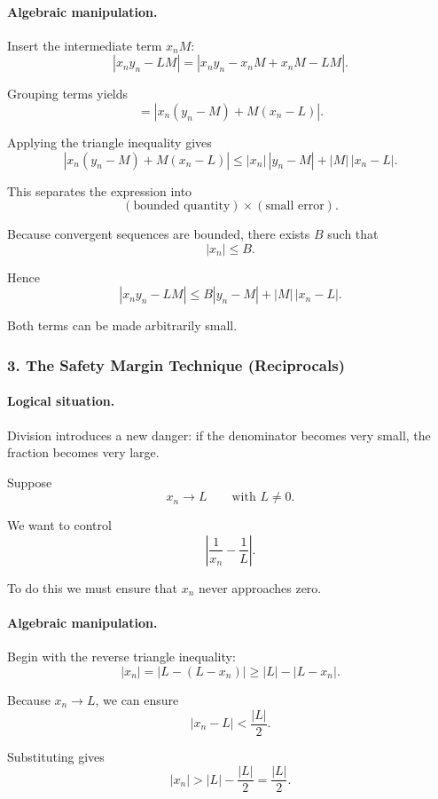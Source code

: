 \paragraph{Algebraic manipulation.}

Insert the intermediate term $x_n M$:
\[
|x_n y_n - LM|
=
|x_n y_n - x_n M + x_n M - LM|.
\]

Grouping terms yields
\[
=
|x_n(y_n - M) + M(x_n - L)|.
\]

Applying the triangle inequality gives
\[
|x_n(y_n - M) + M(x_n - L)|
\le
|x_n|\,|y_n - M|
+
|M|\,|x_n - L|.
\]

This separates the expression into
\[
(\text{bounded quantity}) \times (\text{small error}).
\]

Because convergent sequences are bounded, there exists $B$ such that
\[
|x_n| \le B.
\]

Hence
\[
|x_n y_n - LM|
\le
B|y_n - M| + |M|\,|x_n - L|.
\]

Both terms can be made arbitrarily small.

\bigskip

\subsubsection*{3. The Safety Margin Technique (Reciprocals)}

\paragraph{Logical situation.}

Division introduces a new danger: if the denominator becomes very
small, the fraction becomes very large.

Suppose
\[
x_n \to L
\qquad \text{with } L \neq 0.
\]

We want to control
\[
\left|\frac{1}{x_n} - \frac{1}{L}\right|.
\]

To do this we must ensure that $x_n$ never approaches zero.

\paragraph{Algebraic manipulation.}

Begin with the reverse triangle inequality:
\[
|x_n|
=
|L - (L - x_n)|
\ge
|L| - |L - x_n|.
\]

Because $x_n \to L$, we can ensure
\[
|x_n - L| < \frac{|L|}{2}.
\]

Substituting gives
\[
|x_n|
>
|L| - \frac{|L|}{2}
=
\frac{|L|}{2}.
\]

